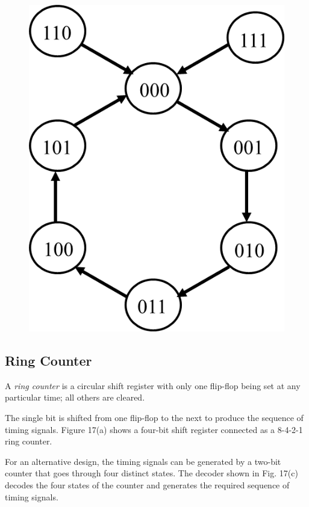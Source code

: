 \begin{figure}[H]
\begin{minipage}{0.49\linewidth}
    \includegraphics[width=\linewidth]{img/self-starting-counter-diagram.png}
    \label{fig:self-starting-counter-diagram.png.png}
  \end{minipage}
\end{figure}


\subsection{Ring Counter}
\label{subsec:ring-counter}

A \textit{ring counter} is a circular shift register with only one flip-flop being set at any particular time; all others are cleared.

The single bit is shifted from one flip-flop to the next to produce the 
sequence of timing signals. Figure 17(a) shows a four-bit shift register connected as a 8-4-2-1 ring counter.

For an alternative design, the timing signals can be generated by a two-bit counter that goes through four distinct states. The decoder shown in Fig. 17(c) decodes the four states of the counter and generates the required sequence of timing signals.

